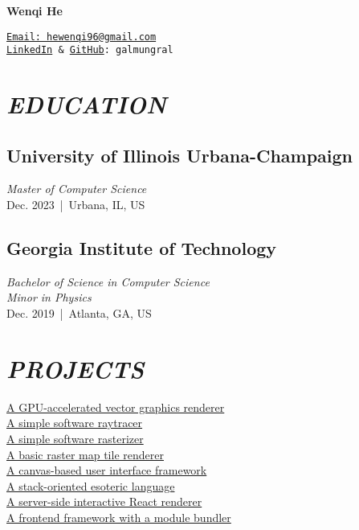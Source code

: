 \documentclass[11pt]{article}
\begin{document}
 
\centering

\begin{minipage}{250pt}
{\Huge\bf Wenqi He}

\vspace{10pt}
\texttt{\href{mailto:hewenqi96@gmail.com}{Email: hewenqi96@gmail.com}}\\
\texttt{\href{https://linkedin.com/in/galmungral}{LinkedIn} \& \href{https://github.com/galmungral}{GitHub}: galmungral}


\section*{\it EDUCATION}

\subsection*{University of Illinois Urbana-Champaign}
\textit{Master of Computer Science}\\
Dec. 2023 \,|\, Urbana, IL, US

\subsection*{Georgia Institute of Technology}
\textit{Bachelor of Science in Computer Science}\\
\textit{Minor in Physics}\\
Dec. 2019 \,|\, Atlanta, GA, US

\section*{\it PROJECTS}

\href{https://github.com/galmungral/polyrender}{A GPU-accelerated vector graphics renderer}\\
\href{https://github.com/galmungral/simple-raytracer}{A simple software raytracer}\\
\href{https://github.com/galmungral/rasterizer}{A simple software rasterizer}\\
\href{https://github.com/galmungral/mercator}{A basic raster map tile renderer}\\
\href{https://github.com/galmungral/michelangelo}{A canvas-based user interface framework}\\
\href{https://github.com/galmungral/hanbun-lang}{A stack-oriented esoteric language} \\
\href{https://github.com/galmungral/react-teletype}{A server-side interactive React renderer} \\
\href{https://github.com/galmungral/replay}{A frontend framework with a module bundler}



\end{minipage}
\end{document}
